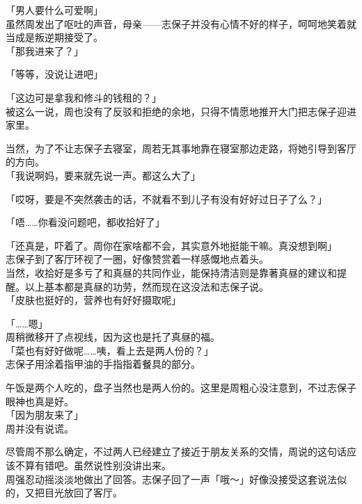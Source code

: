 「男人要什么可爱啊」\\

虽然周发出了呕吐的声音，母亲——志保子并没有心情不好的样子，呵呵地笑着就当成是叛逆期接受了。\\

「那我进来了？」

「等等，没说让进吧」

「这边可是拿我和修斗的钱租的？」\\

被这么一说，周也没有了反驳和拒绝的余地，只得不情愿地推开大门把志保子迎进家里。

当然，为了不让志保子去寝室，周若无其事地靠在寝室那边走路，将她引导到客厅的方向。\\

「我说啊妈，要来就先说一声。都这么大了」

「哎呀，要是不突然袭击的话，不就看不到儿子有没有好好过日子了么？」

「唔……你看没问题吧，都收拾好了」

「还真是，吓着了。周你在家啥都不会，其实意外地挺能干嘛。真没想到啊」\\

志保子到了客厅环视了一圈，好像赞赏着一样感慨地点着头。\\

当然，收拾好是多亏了和真昼的共同作业，能保持清洁则是靠著真昼的建议和提醒。以上基本都是真昼的功劳，然而现在这没法和志保子说。\\

「皮肤也挺好的，营养也有好好摄取呢」

「……嗯」\\

周稍微移开了点视线，因为这也是托了真昼的福。\\

「菜也有好好做呢……咦，看上去是两人份的？」\\

志保子用涂着指甲油的手指指着餐具的部分。

午饭是两个人吃的，盘子当然也是两人份的。这里是周粗心没注意到，不过志保子眼神也真是好。\\

「因为朋友来了」\\

周并没有说谎。

尽管周不那么确定，不过两人已经建立了接近于朋友关系的交情，周说的这句话应该不算有错吧。虽然说性别没讲出来。\\

周强忍动摇淡淡地做出了回答。志保子回了一声「哦～」好像没接受这套说法似的，又把目光放回了客厅。

